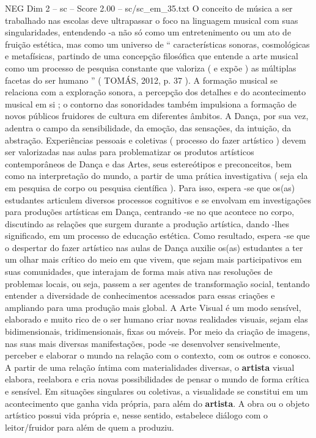\begin{textsample}{NEG Dim 2 – sc – Score 2.00 – sc/sc\_em\_35.txt}
O conceito de música a ser trabalhado nas escolas deve ultrapassar o foco na linguagem musical com suas singularidades, entendendo -a não só como um entretenimento ou um ato de fruição estética, mas como um universo de “ características sonoras, cosmológicas e metafísicas, partindo de uma concepção filosófica que entende a arte musical como um processo de pesquisa constante que valoriza ( e expõe ) as múltiplas facetas do ser humano ” ( TOMÁS, 2012, p. 37 ).
A formação musical se relaciona com a exploração sonora, a percepção dos detalhes e do acontecimento musical em si ; o contorno das sonoridades também impulsiona a formação de novos públicos fruidores de cultura em diferentes âmbitos.
A Dança, por sua vez, adentra o campo da sensibilidade, da emoção, das sensações, da intuição, da abstração.
Experiências pessoais e coletivas ( processo do fazer artístico ) devem ser valorizadas nas aulas para problematizar os produtos artísticos contemporâneos de Dança e das Artes, seus estereótipos e preconceitos, bem como na interpretação do mundo, a partir de uma prática investigativa ( seja ela em pesquisa de corpo ou pesquisa científica ).
Para isso, espera -se que os(as) estudantes articulem diversos processos cognitivos e se envolvam em investigações para produções artísticas em Dança, centrando -se no que acontece no corpo, discutindo as relações que surgem durante a produção artística, dando -lhes significado, em um processo de educação estética.
Como resultado, espera -se que o despertar do fazer artístico nas aulas de Dança auxilie os(as) estudantes a ter um olhar mais crítico do meio em que vivem, que sejam mais participativos em suas comunidades, que interajam de forma mais ativa nas resoluções de problemas locais, ou seja, passem a ser agentes de transformação social, tentando entender a diversidade de conhecimentos acessados para essas criações e ampliando para uma produção mais global.
A Arte Visual é um modo sensível, elaborado e muito rico de o ser humano criar novas realidades visuais, sejam elas bidimensionais, tridimensionais, fixas ou móveis.
Por meio da criação de imagens, nas suas mais diversas manifestações, pode -se desenvolver sensivelmente, perceber e elaborar o mundo na relação com o contexto, com os outros e conosco.
A partir de uma relação íntima com materialidades diversas, o \textbf{artista} visual elabora, reelabora e cria novas possibilidades de pensar o mundo de forma crítica e sensível.
Em situações singulares ou coletivas, a visualidade se constitui em um acontecimento que ganha vida própria, para além do \textbf{artista}.
A obra ou o objeto artístico possui vida própria e, nesse sentido, estabelece diálogo com o leitor/fruidor para além de quem a produziu.

\end{textsample}
